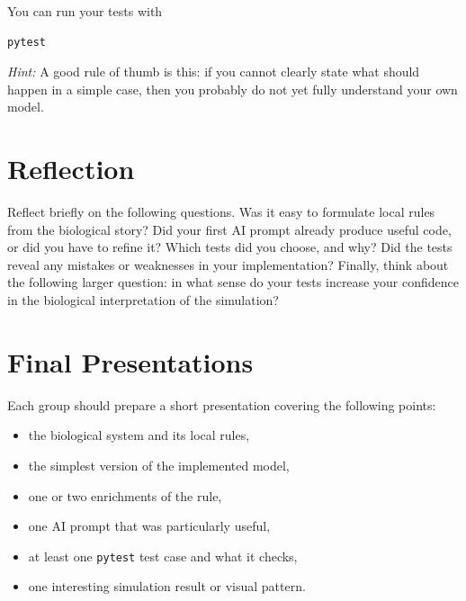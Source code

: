 \documentclass[paper=letter, fontsize=12pt]{article}
\numberwithin{equation}{section}
\begin{document}
You can run your tests with

\begin{lstlisting}
pytest
\end{lstlisting}

\emph{Hint:} A good rule of thumb is this: if you cannot clearly state what should happen in a simple case, then you probably do not yet fully understand your own model.


\section*{Reflection}

\begin{taskbox}
Reflect briefly on the following questions. Was it easy to formulate local rules from the biological story? Did your first AI prompt already produce useful code, or did you have to refine it? Which tests did you choose, and why? Did the tests reveal any mistakes or weaknesses in your implementation? Finally, think about the following larger question: in what sense do your tests increase your confidence in the biological interpretation of the simulation?
\end{taskbox}

\section*{Final Presentations}

Each group should prepare a short presentation covering the following points:
\begin{itemize}
\item the biological system and its local rules,
\item the simplest version of the implemented model,
\item one or two enrichments of the rule,
\item one AI prompt that was particularly useful,
\item at least one \texttt{pytest} test case and what it checks,
\item one interesting simulation result or visual pattern.
\end{itemize}




%


\end{document}
